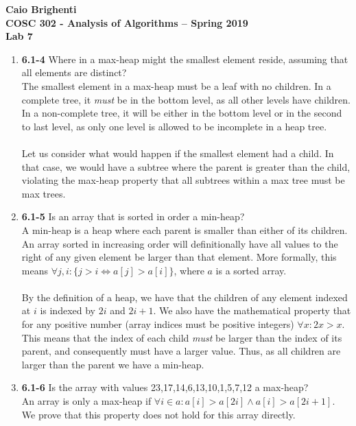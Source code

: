 \documentclass{article}
\begin{document}
\noindent \textbf{Caio Brighenti }\\
\noindent \textbf{COSC 302 - Analysis of Algorithms -- Spring 2019}\\%
\noindent \textbf{Lab 7}\vspace{1em}\\
\begin{enumerate} 
	\item \textbf{6.1-4} Where in a max-heap might the smallest element reside, assuming that all elements are distinct?
	\\ The smallest element in a max-heap must be a leaf with no children. In a complete tree, it \emph{must} be in the bottom level, as all other levels have children. In a non-complete tree, it will be either in the bottom level or in the second to last level, as only one level is allowed to be incomplete in a heap tree.
	\\\\ Let us consider what would happen if the smallest element had a child. In that case, we would have a subtree where the parent is greater than the child, violating the max-heap property that all subtrees within a max tree must be max trees.
	\item \textbf{6.1-5} Is an array that is sorted in order a min-heap?
	\\ A min-heap is a heap where each parent is smaller than either of its children. An array sorted in increasing order will definitionally have all values to the right of any given element be larger than that element. More formally, this means $\forall j,i: \{j > i \iff a[j] > a[i]\}$, where $a$ is a sorted array. 
	\\ \\ By the definition of a heap, we have that the children of any element indexed at $i$ is indexed by $2i$ and $2i+1$. We also have the mathematical property that for any positive number (array indices must be positive integers) $\forall x: 2x > x$. This means that the index of each child \emph{must} be larger than the index of its parent, and consequently must have a larger value. Thus, as all children are larger than the parent we have a min-heap.  
	\item \textbf{6.1-6} Is the array with values {23,17,14,6,13,10,1,5,7,12} a max-heap?
	\\ An array is only a max-heap if $\forall i \in a: a[i] > a[2i] \land a[i] > a[2i+1]$. We prove that this property does not hold for this array directly.

\end{enumerate}
\end{document}

